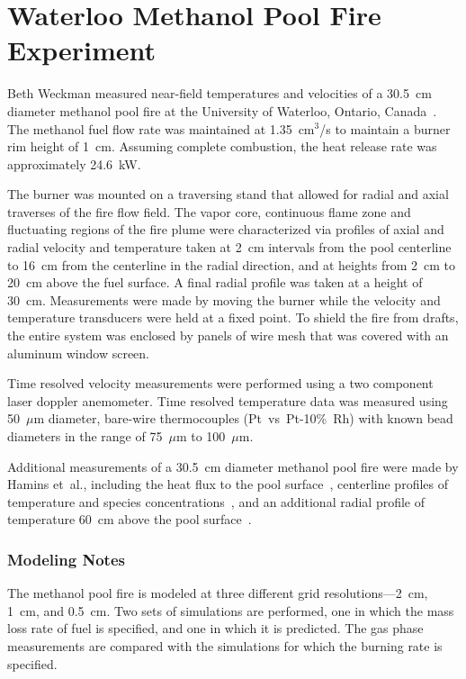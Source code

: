 \section{Waterloo Methanol Pool Fire Experiment}
\label{Waterloo_Methanol_Description}

Beth Weckman measured near-field temperatures and velocities of a 30.5~cm diameter methanol pool fire at the University of Waterloo, Ontario, Canada~\cite{Weckman:CF1996}. The methanol fuel flow rate was maintained at 1.35~cm$^3$/s to maintain a burner rim height of 1~cm. Assuming complete combustion, the heat release rate was approximately 24.6~kW.

The burner was mounted on a traversing stand that allowed for radial and axial traverses of the fire flow field. The vapor core, continuous flame zone and fluctuating regions of the fire plume were characterized via profiles of axial and radial velocity and temperature taken at 2~cm intervals from the pool centerline to 16~cm from the centerline in the radial direction, and at heights from 2~cm to 20~cm above the fuel surface. A final radial profile was taken at a height of 30~cm. Measurements were made by moving the burner while the velocity and temperature transducers were held at a fixed point. To shield the fire from drafts, the entire system was enclosed by panels of wire mesh that was covered with an aluminum window screen.

Time resolved velocity measurements were performed using a two component laser doppler anemometer. Time resolved temperature data was measured using 50~$\mu$m diameter, bare-wire thermocouples (Pt~vs~Pt-10\%~Rh) with known bead diameters in the range of 75~$\mu$m to 100~$\mu$m.

Additional measurements of a 30.5~cm diameter methanol pool fire were made by Hamins et~al., including the heat flux to the pool surface~\cite{Hamins:CST1994}, centerline profiles of temperature and species concentrations~\cite{Hamins:TN1928}, and an additional radial profile of temperature 60~cm above the pool surface~\cite{Hamins:TN1928}.

\subsubsection{Modeling Notes}

The methanol pool fire is modeled at three different grid resolutions---2~cm, 1~cm, and 0.5~cm. Two sets of simulations are performed, one in which the mass loss rate of fuel is specified, and one in which it is predicted. The gas phase measurements are compared with the simulations for which the burning rate is specified.

